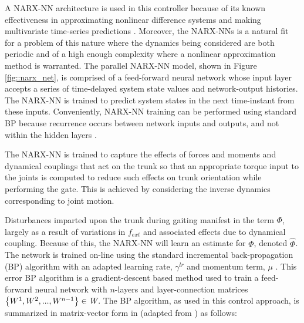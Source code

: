 		A NARX-NN architecture is used in this controller because of  its known effectiveness in approximating nonlinear difference systems and making multivariate time-series predictions \cite{Tsungnan1996,ChenBillings1990,Hihi1996,Billings2013}. Moreover, the NARX-NNs is a natural fit for a problem of this nature where the dynamics being considered are both periodic and of a high enough complexity where a nonlinear approximation method is warranted. The parallel NARX-NN model, shown in Figure \ref{fig::narx_net}, is comprised of a feed-forward neural network whose input layer accepts a series of time-delayed system state values and network-output histories. The NARX-NN is trained to predict system states in the next time-instant from these inputs. Conveniently, NARX-NN training can be performed using standard BP because recurrence occurs between network inputs and outputs, and not within the hidden layers \cite{Nelles2001}.

		The NARX-NN is trained to capture the effects of forces and moments and dynamical couplings that act on the trunk so that an appropriate torque input to the joints is computed to reduce such effects on trunk orientation while performing the gate. This is achieved by considering the inverse dynamics corresponding to joint motion.

		Disturbances imparted upon the trunk during gaiting manifest in the term $\Phi$, largely as a result of variations in $f_{ext}$ and associated effects due to dynamical coupling. Because of this, the NARX-NN will learn an estimate for $\Phi$, denoted $\hat{\Phi}$. The network is trained on-line using the standard incremental back-propagation (BP) algorithm with an adapted learning rate, $\gamma^{lr}$ and momentum term, $\mu$ \cite{Rumelhart1988,Rumelhart1995}. This error BP algorithm is a gradient-descent based method used to train a feed-forward neural network with $n$-layers and layer-connection matrices $\left\{W^{1},W^{2},...,W^{n-1}\right\} \in \emph{W}$. The BP algorithm, as used in this control approach, is summarized in matrix-vector form in (adapted from \cite{Rojas1996ch7}) as follows: 

